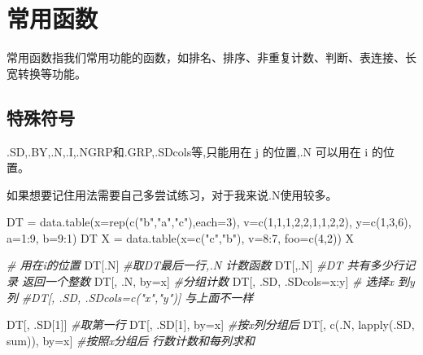 \documentclass[
]{book}
\newenvironment{Shaded}{\begin{snugshade}}{\end{snugshade}}
\newcommand{\AttributeTok}[1]{\textcolor[rgb]{0.77,0.63,0.00}{#1}}
\newcommand{\CommentTok}[1]{\textcolor[rgb]{0.56,0.35,0.01}{\textit{#1}}}
\newcommand{\DecValTok}[1]{\textcolor[rgb]{0.00,0.00,0.81}{#1}}
\newcommand{\FunctionTok}[1]{\textcolor[rgb]{0.00,0.00,0.00}{#1}}
\newcommand{\NormalTok}[1]{#1}
\newcommand{\OtherTok}[1]{\textcolor[rgb]{0.56,0.35,0.01}{#1}}
\newcommand{\SpecialCharTok}[1]{\textcolor[rgb]{0.00,0.00,0.00}{#1}}
\newcommand{\StringTok}[1]{\textcolor[rgb]{0.31,0.60,0.02}{#1}}
\begin{document}
\hypertarget{ux5e38ux7528ux51fdux6570-3}{%
\section{常用函数}\label{ux5e38ux7528ux51fdux6570-3}}

常用函数指我们常用功能的函数，如排名、排序、非重复计数、判断、表连接、长宽转换等功能。

\hypertarget{ux7279ux6b8aux7b26ux53f7}{%
\subsection{特殊符号}\label{ux7279ux6b8aux7b26ux53f7}}

.SD,.BY,.N,.I,.NGRP和.GRP,.SDcols等,只能用在 j 的位置,.N 可以用在 i 的位置。

如果想要记住用法需要自己多尝试练习，对于我来说.N使用较多。

\begin{Shaded}
\begin{Highlighting}[]
\NormalTok{DT }\OtherTok{=} \FunctionTok{data.table}\NormalTok{(}\AttributeTok{x=}\FunctionTok{rep}\NormalTok{(}\FunctionTok{c}\NormalTok{(}\StringTok{"b"}\NormalTok{,}\StringTok{"a"}\NormalTok{,}\StringTok{"c"}\NormalTok{),}\AttributeTok{each=}\DecValTok{3}\NormalTok{), }\AttributeTok{v=}\FunctionTok{c}\NormalTok{(}\DecValTok{1}\NormalTok{,}\DecValTok{1}\NormalTok{,}\DecValTok{1}\NormalTok{,}\DecValTok{2}\NormalTok{,}\DecValTok{2}\NormalTok{,}\DecValTok{1}\NormalTok{,}\DecValTok{1}\NormalTok{,}\DecValTok{2}\NormalTok{,}\DecValTok{2}\NormalTok{), }\AttributeTok{y=}\FunctionTok{c}\NormalTok{(}\DecValTok{1}\NormalTok{,}\DecValTok{3}\NormalTok{,}\DecValTok{6}\NormalTok{), }\AttributeTok{a=}\DecValTok{1}\SpecialCharTok{:}\DecValTok{9}\NormalTok{, }\AttributeTok{b=}\DecValTok{9}\SpecialCharTok{:}\DecValTok{1}\NormalTok{)}
\NormalTok{DT}
\NormalTok{X }\OtherTok{=} \FunctionTok{data.table}\NormalTok{(}\AttributeTok{x=}\FunctionTok{c}\NormalTok{(}\StringTok{"c"}\NormalTok{,}\StringTok{"b"}\NormalTok{), }\AttributeTok{v=}\DecValTok{8}\SpecialCharTok{:}\DecValTok{7}\NormalTok{, }\AttributeTok{foo=}\FunctionTok{c}\NormalTok{(}\DecValTok{4}\NormalTok{,}\DecValTok{2}\NormalTok{))}
\NormalTok{X}

\CommentTok{\# 用在i的位置}
\NormalTok{DT[.N] }\CommentTok{\#取DT最后一行,.N 计数函数}
\NormalTok{DT[,.N] }\CommentTok{\#DT 共有多少行记录 返回一个整数}
\NormalTok{DT[, .N, by}\OtherTok{=}\NormalTok{x]  }\CommentTok{\#分组计数}
\NormalTok{DT[, .SD, .SDcols}\OtherTok{=}\NormalTok{x}\SpecialCharTok{:}\NormalTok{y]  }\CommentTok{\# 选择x 到y 列}
\CommentTok{\#DT[, .SD, .SDcols=c("x","y")] 与上面不一样}

\NormalTok{DT[, .SD[}\DecValTok{1}\NormalTok{]] }\CommentTok{\#取第一行}
\NormalTok{DT[, .SD[}\DecValTok{1}\NormalTok{], by}\OtherTok{=}\NormalTok{x] }\CommentTok{\#按x列分组后}
\NormalTok{DT[, }\FunctionTok{c}\NormalTok{(.N, }\FunctionTok{lapply}\NormalTok{(.SD, sum)), by}\OtherTok{=}\NormalTok{x] }\CommentTok{\#按照x分组后 行数计数和每列求和}
\end{Highlighting}
\end{Shaded}
\end{document}
